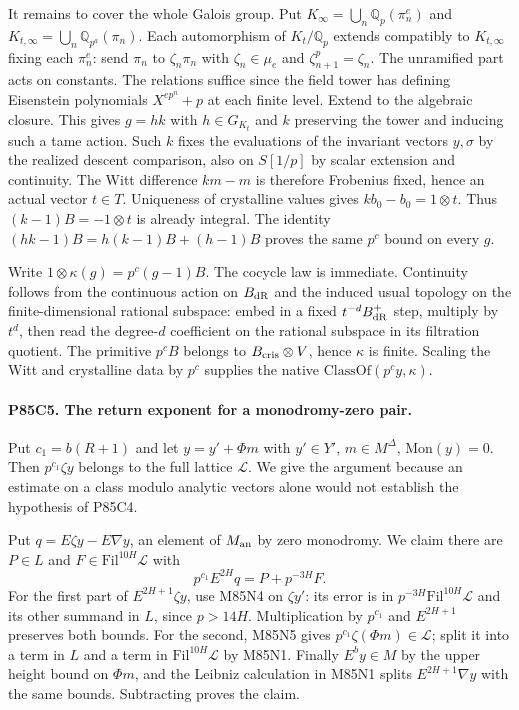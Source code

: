 It remains to cover the whole Galois group. Put
$K_\infty=\bigcup_n\mathbb Q_p(\pi_n^e)$ and
$K_{t,\infty}=\bigcup_n\mathbb Q_{p^a}(\pi_n)$. Each
automorphism of $K_t/\mathbb Q_p$ extends compatibly to
$K_{t,\infty}$ fixing each $\pi_n^e$: send $\pi_n$ to
$\zeta_n\pi_n$ with $\zeta_n\in\mu_e$ and
$\zeta_{n+1}^p=\zeta_n$. The unramified part acts on constants.
The relations suffice since the field tower has defining
Eisenstein polynomials $X^{e p^n}+p$ at each finite level.
Extend to the algebraic closure. This gives $g=hk$ with
$h\in G_{K_t}$ and $k$ preserving the tower and inducing such
a tame action. Such $k$ fixes the evaluations of the invariant
vectors $y,\sigma$ by the realized descent comparison, also on
$S[1/p]$ by scalar extension and continuity. The Witt difference
$km-m$ is therefore Frobenius fixed, hence an actual vector
$t\in T$. Uniqueness of crystalline values gives
$kb_0-b_0=1\otimes t$. Thus $(k-1)B=-1\otimes t$ is already
integral. The identity $(hk-1)B=h(k-1)B+(h-1)B$ proves the
same $p^c$ bound on every $g$.

Write $1\otimes\kappa(g)=p^c(g-1)B$. The cocycle law is immediate.
Continuity follows from the continuous action on $B_{\rm dR}$ and
the induced usual topology on the finite-dimensional rational
subspace: embed in a fixed $t^{-d}B_{\rm dR}^+$ step, multiply
by $t^d$, then read the degree-$d$ coefficient on the rational
subspace in its filtration quotient. The primitive $p^c B$
belongs to $B_{\rm cris}\otimes V$, hence $\kappa$ is finite.
Scaling the Witt and crystalline data by $p^c$ supplies the native
$\mathrm{ClassOf}(p^cy,\kappa)$.

\paragraph{P85C5. The return exponent for a monodromy-zero pair.}
Put $c_1=b(R+1)$ and let $y=y'+\Phi m$ with $y'\in Y'$,
$m\in M^\Delta$, $\mathrm{Mon}(y)=0$. Then $p^{c_1}\zeta y$
belongs to the full lattice $\mathcal L$. We give the argument
because an estimate on a class modulo analytic vectors alone
would not establish the hypothesis of P85C4.

Put $q=E\zeta y-E\nabla y$, an element of $M_{\rm an}$ by zero
monodromy. We claim there are $P\in L$ and
$F\in\mathrm{Fil}^{10H}\mathcal L$ with
\[
        p^{c_1}E^{2H}q=P+p^{-3H}F.
\]
For the first part of $E^{2H+1}\zeta y$, use M85N4 on $\zeta y'$:
its error is in $p^{-3H}\mathrm{Fil}^{10H}\mathcal L$ and its
other summand in $L$, since $p>14H$. Multiplication by $p^{c_1}$
and $E^{2H+1}$ preserves both bounds. For the second, M85N5
gives $p^{c_1}\zeta(\Phi m)\in\mathcal L$; split it into a term
in $L$ and a term in $\mathrm{Fil}^{10H}\mathcal L$ by M85N1.
Finally $E^by\in M$ by the upper height bound on $\Phi m$,
and the Leibniz calculation in M85N1 splits $E^{2H+1}\nabla y$
with the same bounds. Subtracting proves the claim.

